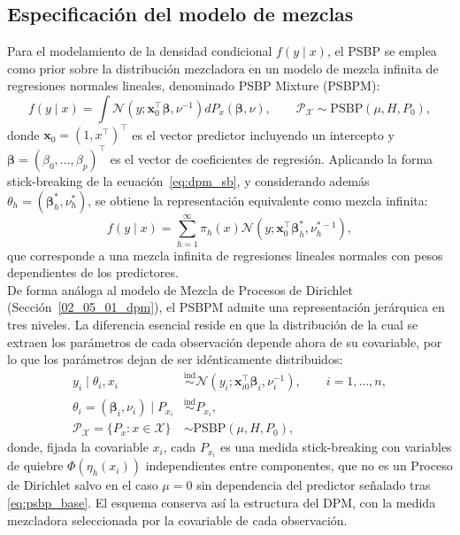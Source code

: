 \subsection{Especificación del modelo de mezclas}
\label{03_03_01_especificacion_modelo_mezclas}
Para el modelamiento de la densidad condicional $f(y \mid x)$, el PSBP se emplea como prior sobre la distribución mezcladora en un modelo de mezcla infinita de regresiones normales lineales, denominado PSBP Mixture (PSBPM):
\begin{equation}\label{eq:psbpm}
    f(y \mid x) = \int \mathcal{N}(y; \mathbf{x}_0^\top \boldsymbol{\beta},
    \nu^{-1}) dP_x(\boldsymbol{\beta}, \nu),
    \qquad
    \mathcal{P}_{\mathcal{X}} \sim \mathrm{PSBP}(\mu, H, P_0),
\end{equation}
donde $\mathbf{x}_0 = (1, x^\top)^\top$ es el vector predictor incluyendo un intercepto y $\boldsymbol{\beta} = (\beta_0, \dots, \beta_p)^\top$ es el vector de coeficientes de regresión. Aplicando la forma stick-breaking de la ecuación~\eqref{eq:dpm_sb}, y considerando además $\theta_h = (\boldsymbol{\beta}_h^*, \nu_h^*)$, se obtiene la representación equivalente como mezcla infinita:
\begin{equation}\label{eq:psbpm_mezcla}
    f(y \mid x) = \sum_{h=1}^{\infty}
    \pi_h(x) \mathcal{N}\!\left(y; \mathbf{x}_0^\top
    \boldsymbol{\beta}_h^*, \nu_h^{*-1}\right),
\end{equation}
que corresponde a una mezcla infinita de regresiones lineales normales con pesos dependientes de los predictores.\\
 
De forma análoga al modelo de Mezcla de Procesos de Dirichlet (Sección~\ref{02_05_01_dpm}), el PSBPM admite una representación jerárquica en tres niveles. La diferencia esencial reside en que la distribución de la cual se extraen los parámetros de cada observación depende ahora de su covariable, por lo que los parámetros dejan de ser idénticamente distribuidos:
\begin{equation}\label{eq:psbpm_jerarquico}
\begin{aligned}
    y_i \mid \theta_i, x_i &\overset{\mathrm{ind}}{\sim}
    \mathcal{N}\!\left(y_i; \mathbf{x}_{i0}^\top \boldsymbol{\beta}_i,
    \nu_i^{-1}\right),
    \qquad i = 1, \dots, n, \\
    \theta_i = (\boldsymbol{\beta}_i, \nu_i) \mid P_{x_i}
    &\overset{\mathrm{ind}}{\sim} P_{x_i}, \\
    \mathcal{P}_{\mathcal{X}} = \{P_x : x \in \mathcal{X}\}
    &\sim \mathrm{PSBP}(\mu, H, P_0),
\end{aligned}
\end{equation}
donde, fijada la covariable $x_i$, cada $P_{x_i}$ es una medida stick-breaking con variables de quiebre $\Phi(\eta_h(x_i))$ independientes entre componentes, que no es un Proceso de Dirichlet salvo en el caso $\mu = 0$ sin dependencia del predictor señalado tras \eqref{eq:psbp_base}. El esquema conserva así la estructura del DPM, con la medida mezcladora seleccionada por la covariable de cada observación.\\
 
